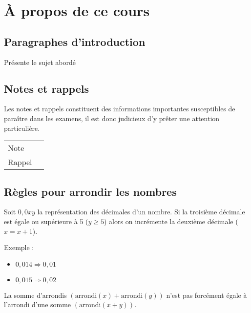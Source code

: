 \chapter*{À propos de ce cours}



\section*{Paragraphes d'introduction}
\begin{intro}
	Présente le sujet abordé 
\end{intro}



\section*{Notes et rappels}
\begin{note}
	Les notes et rappels constituent des informations importantes susceptibles de paraître dans les examens, il est donc judicieux d'y prêter une attention particulière.
	\begin{center}
		\begin{tabular}{l@{\qquad}l}
			Note   & \Large\righthand \\
			Rappel & \Large\aldine
		\end{tabular}
	\end{center}
\end{note}



\section*{Règles pour arrondir les nombres}
Soit $0,0xy$ la représentation des décimales d'un nombre. Si la troisième décimale est égale ou supérieure à 5 ($y \geq 5$) alors on incrémente la deuxième décimale ($x = x + 1$).

Exemple :
\begin{itemize}
	\item $0,014 \Rightarrow 0,01$
	\item $0,015 \Rightarrow 0,02$
\end{itemize}

\marginpar{\color{BrickRed}\Large{\danger}}
La somme d'arrondis \( (\text{arrondi}(x)+\text{arrondi}(y)) \) n’est pas forcément égale à l’arrondi d'une somme \( (\text{arrondi}(x+y) ) \).

